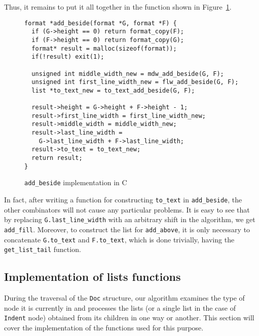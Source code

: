 \documentclass[14pt]{constructor-diploma}
\begin{document}
Thus, it remains to put it all together in the function shown in Figure~\ref{fig:add_beside_C}.
\begin{figure}[H]
\begin{mdframed}[backgroundcolor=bg]
\begin{verbatim}
format *add_beside(format *G, format *F) {
  if (G->height == 0) return format_copy(F);
  if (F->height == 0) return format_copy(G);
  format* result = malloc(sizeof(format));
  if(!result) exit(1);

  unsigned int middle_width_new = mdw_add_beside(G, F);
  unsigned int first_line_width_new = flw_add_beside(G, F);
  list *to_text_new = to_text_add_beside(G, F);

  result->height = G->height + F->height - 1;
  result->first_line_width = first_line_width_new;
  result->middle_width = middle_width_new;
  result->last_line_width = 
    G->last_line_width + F->last_line_width;
  result->to_text = to_text_new;
  return result;
}
\end{verbatim}
\end{mdframed}
\caption{\texttt{add\_beside} implementation in C}
\label{fig:add_beside_C}
\end{figure}

In fact, after writing a function for constructing \texttt{to\_text} in \texttt{add\_beside}, the other combinators will not cause any particular problems. 
It is easy to see that by replacing \texttt{G.last\_line\_width} with an arbitrary shift in the algorithm, we get \texttt{add\_fill}. 
Moreover, to construct the list for \texttt{add\_above}, it is only necessary to concatenate \texttt{G.to\_text} and \texttt{F.to\_text}, which is done trivially, having the \texttt{get\_list\_tail} function.

\subsection{Implementation of lists functions}
During the traversal of the \texttt{Doc} structure, our algorithm examines the type of node it is currently in and processes the lists 
(or a single list in the case of \texttt{Indent} node) obtained from its children in one way or another. 
This section will cover the implementation of the functions used for this purpose.
\end{document}
